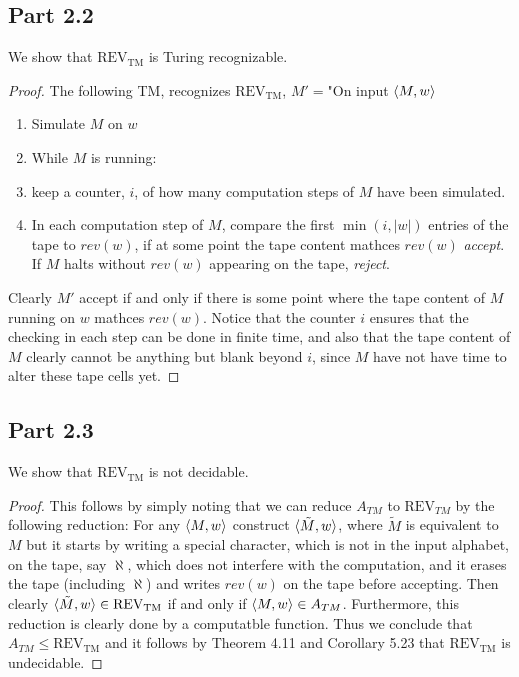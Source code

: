 \documentclass[a4paper,11pt]{article}
\newcommand{\abs}[1]{\left\lvert #1 \right\rvert}
\numberwithin{equation}{section}
\begin{document}
	\subsection*{Part 2.2}
	We show that $ \text{REV}_{\text{TM}} $ is Turing recognizable.
	\begin{proof}
		The following TM, recognizes $ \text{REV}_{\text{TM}} $, $ M'= $"On input $ \braket{M,w} $\begin{enumerate}
			\item Simulate $ M $ on $ w $ 
			\item While $ M $ is running: 
			\item\qquad keep a counter, $ i $, of how many computation steps of $ M $ have been simulated.
			
			\item \begin{addmargin}[2em]{0em}In each computation step of $ M $, compare the first $ \min(i,\abs{w}) $ entries of the tape to $ rev(w) $, if at some point the tape content mathces $ rev(w) $ \emph{accept}. If $ M $ halts without $ rev(w) $ appearing on the tape, \emph{reject}.
				\end{addmargin}
		\end{enumerate}
		Clearly $ M' $ accept if and only if there is some point where the tape content of $ M $ running on $ w $ mathces $ rev(w) $. Notice that the counter $ i $ ensures that the checking in each step can be done in finite time, and also that the tape content of $ M $ clearly cannot be anything but blank beyond $ i $, since $ M $ have not have time to alter these tape cells yet.
	\end{proof} 
	\subsection*{Part 2.3}
	We show that $ \text{REV}_{\text{TM}} $ is not decidable.
	\begin{proof}
		This follows by simply noting that we can reduce $ A_{TM} $ to $ \text{REV}_{TM} $ by the following reduction: For any $ \braket{M,w} $ construct $ \braket{\tilde{M},w} $, where $ \tilde{M} $ is equivalent to $ M $ but it starts by writing a special character, which is not in the input alphabet, on the tape, say $\aleph $, which does not interfere with the computation, and it erases the tape (including $ \aleph $) and writes $ rev(w) $ on the tape before accepting. Then clearly $ \braket{\tilde{M},w}\in \text{REV}_{\text{TM}} $ if and only if $ \braket{M,w}\in A_{TM} $. Furthermore, this reduction is clearly done by a computatble function. Thus we conclude that $ A_{TM}\leq \text{REV}_{\text{TM}} $ and it follows by Theorem 4.11 and Corollary 5.23 that $ \text{REV}_{\text{TM}} $ is undecidable.
	\end{proof}
	
\end{document}
